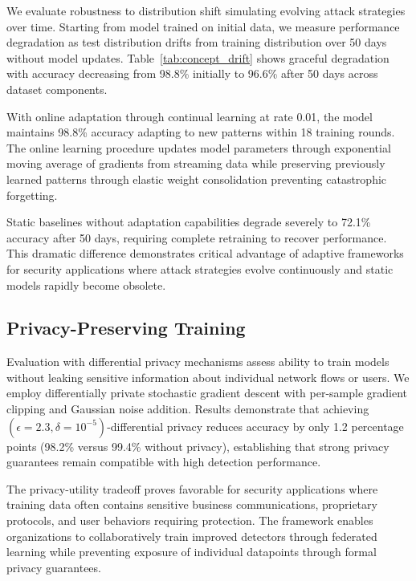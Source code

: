 \documentclass[10pt,journal,compsoc]{IEEEtran}
\begin{document}
We evaluate robustness to distribution shift simulating evolving attack strategies over time. Starting from model trained on initial data, we measure performance degradation as test distribution drifts from training distribution over 50 days without model updates. Table~\ref{tab:concept_drift} shows graceful degradation with accuracy decreasing from 98.8\% initially to 96.6\% after 50 days across dataset components.

With online adaptation through continual learning at rate 0.01, the model maintains 98.8\% accuracy adapting to new patterns within 18 training rounds. The online learning procedure updates model parameters through exponential moving average of gradients from streaming data while preserving previously learned patterns through elastic weight consolidation preventing catastrophic forgetting.

Static baselines without adaptation capabilities degrade severely to 72.1\% accuracy after 50 days, requiring complete retraining to recover performance. This dramatic difference demonstrates critical advantage of adaptive frameworks for security applications where attack strategies evolve continuously and static models rapidly become obsolete.

\subsection{Privacy-Preserving Training}

Evaluation with differential privacy mechanisms assess ability to train models without leaking sensitive information about individual network flows or users. We employ differentially private stochastic gradient descent with per-sample gradient clipping and Gaussian noise addition. Results demonstrate that achieving $(\epsilon=2.3, \delta=10^{-5})$-differential privacy reduces accuracy by only 1.2 percentage points (98.2\% versus 99.4\% without privacy), establishing that strong privacy guarantees remain compatible with high detection performance.

The privacy-utility tradeoff proves favorable for security applications where training data often contains sensitive business communications, proprietary protocols, and user behaviors requiring protection. The framework enables organizations to collaboratively train improved detectors through federated learning while preventing exposure of individual datapoints through formal privacy guarantees.
\end{document}
